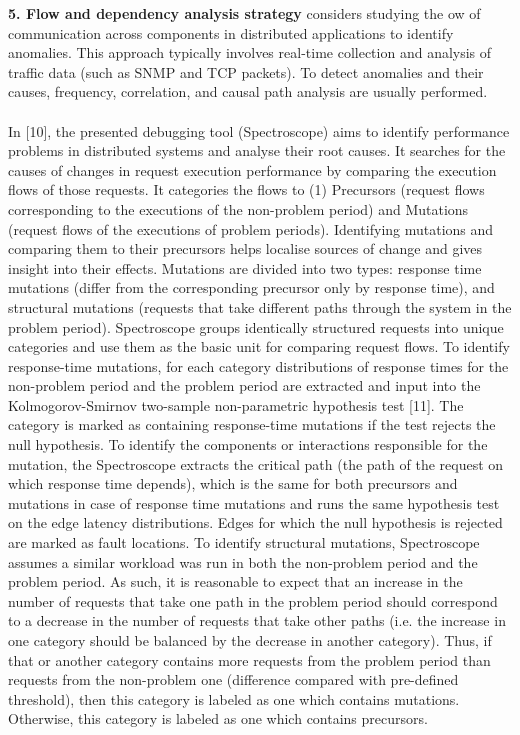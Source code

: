 \documentclass[]{usiinfprospectus}
\begin{document}
%
\textbf{5. Flow and dependency analysis strategy} considers studying the ow of communication across components in distributed applications to identify anomalies. This approach typically involves real-time collection and analysis of traffic data (such as SNMP and TCP packets). To detect anomalies and their causes, frequency, correlation, and causal path analysis are usually performed.\\\\
In [10], the presented debugging tool (Spectroscope) aims to identify performance problems in distributed systems and analyse their root causes. It searches for the causes of changes in request execution performance by comparing the execution flows of those requests. It categories the flows to (1) Precursors (request flows corresponding to the executions of the non-problem period) and Mutations (request flows of the executions of problem periods). Identifying mutations and comparing them to their precursors helps localise sources of change and gives insight into their effects. Mutations are divided into two types: response time mutations (differ from the corresponding precursor only by response time), and structural mutations (requests that take different paths through the system in the problem period). Spectroscope groups identically structured requests into unique categories and use them as the basic unit for comparing request flows. To identify response-time mutations, for each category distributions of response times for the non-problem period and the problem period are extracted and input into the Kolmogorov-Smirnov two-sample non-parametric hypothesis test [11]. The category is marked as containing response-time mutations if the test rejects the null hypothesis. To identify the components or interactions responsible for the mutation, the Spectroscope extracts the critical path (the path of the request on which response time depends), which is the same for both precursors and mutations in case of response time mutations and runs the same hypothesis test on the edge latency distributions. Edges for which the null hypothesis is rejected are marked as fault locations. To identify structural mutations, Spectroscope assumes a similar workload was run in both the non-problem period and the problem period. As such, it is reasonable to expect that an increase in the number of requests that take one path in the problem period should correspond to a decrease in the number of requests that take other paths (i.e. the increase in one category should be balanced by the decrease in another category). Thus, if that or another category contains more requests from the problem period than requests from the non-problem one (difference compared with pre-defined threshold), then this category is labeled as one which contains mutations. Otherwise, this category is labeled as one which contains precursors.
%
%
%
\end{document}

